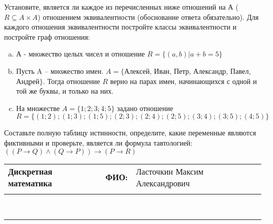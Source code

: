 \documentclass[10pt]{exam}
\newcommand{\class}{Дискретная математика}
\newcommand{\examdate}{}
\begin{document}
\begin{questions}
\question
Установите, является ли каждое из перечисленных ниже отношений на А ($R \subseteq A \times A$) отношением эквивалентности (обоснование ответа обязательно). Для каждого отношения эквивалентности постройте классы 
эквивалентности и постройте граф отношения:
\begin{enumerate} [a)]\setcounter{enumi}{0}
\item А - множество целых чисел и отношение $R = \{(a,b)|a + b = 5\}$
\item Пусть A – множество имен. $A = \{ $Алексей, Иван, Петр, Александр, Павел, Андрей$ \}$. Тогда отношение $R $ верно на парах имен, начинающихся с одной и той же буквы, и только на них.
\item На множестве $A = \{1; 2; 3; 4; 5\}$ задано отношение $R = \{(1; 2); (1; 3); (1; 5); (2; 3); (2; 4); (2; 5); (3; 4); (3; 5); (4; 5)\}$
\end{enumerate}\question Составьте полную таблицу истинности, определите, какие переменные являются фиктивными и проверьте, является ли формула тавтологией:
$(( P \rightarrow Q) \land (Q \rightarrow P)) \rightarrow (P \rightarrow R)$

\end{questions}
\newpage
\begin{flushright}
\begin{tabular}{p{2.8in} r l}
\textbf{\class} & \textbf{ФИО:} &Ласточкин Максим Александрович
\\

\textbf{\examdate} &&\\
\end{tabular}\\
\end{flushright}
\rule[1ex]{\textwidth}{.1pt}
\end{document}
